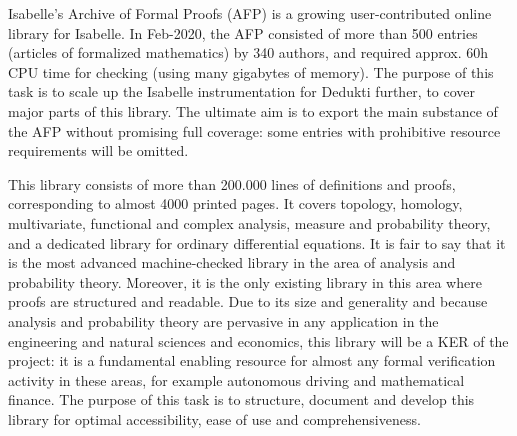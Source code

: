 \begin{workpackage}[id=libraries,wphases=0-48,type=RTD,
  short=Libraries,%
  title=Libraries,
  lead=Inr,
  InrRM=10,
  TumRM=39]
\begin{tasklist}
\begin{task}[id=mathcomp,title=MathComp]
\end{task}

\begin{task}[id=milc,title=Revised Coq Analysis Library]
\end{task}


\begin{task}[id=afp,title=Isabelle's Archive of Formal Proofs]
Isabelle's Archive of Formal Proofs (AFP) \cite{isabelle-afp} is a
growing user-contributed online library for Isabelle. In Feb-2020, the
AFP consisted of more than 500 entries (articles of formalized
mathematics) by 340 authors, and required approx. 60h CPU time for
checking (using many gigabytes of memory).  The purpose of this task
is to scale up the Isabelle instrumentation for Dedukti further, to
cover major parts of this library. The ultimate aim is to export the main
substance of the AFP without promising full coverage: some entries
with prohibitive resource requirements will be omitted.
\end{task}

\begin{task}[id=isaAnalysisProb,title=The Isabelle Analysis \&
  Probability Theory library]
This library consists of more than
200.000 lines of definitions and proofs, corresponding to almost 4000 printed
pages. It covers topology, homology, multivariate, functional and complex
analysis, measure and probability theory, and a dedicated library for
ordinary differential equations. It is fair to say that it is the most
advanced machine-checked library in the area of analysis and probability
theory. Moreover, it is the only existing library in this area where
proofs are structured and readable. Due to its size and generality and
because analysis and probability theory are pervasive in any application in
the engineering and natural sciences and economics, this library will be a
KER of the project: it is a fundamental enabling resource for almost any
formal verification activity in these areas, for example autonomous driving
and mathematical finance. The purpose of this task is to structure, document
and develop this library for optimal accessibility, ease of use and
comprehensiveness.


\end{task}
\end{tasklist}
\end{workpackage}
